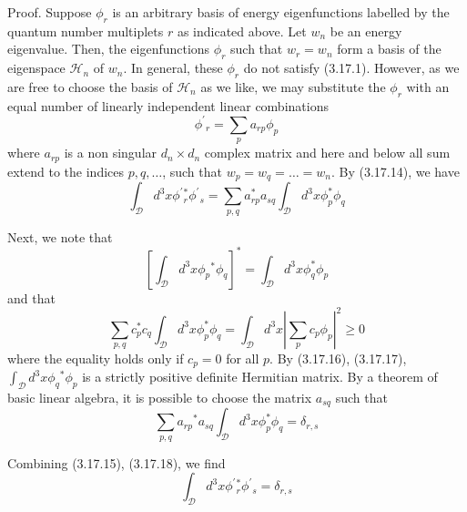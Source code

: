 \documentclass{article}
\begin{document}
Proof. Suppose $\phi_{r}$ is an arbitrary basis of energy eigenfunctions labelled by the quantum number multiplets $r$ as indicated above. Let $w_{n}$ be an energy eigenvalue. Then, the eigenfunctions $\phi_{r}$ such that $w_{r}=w_{n}$ form a basis of the eigenspace $\mathcal{H}_{n}$ of $w_{n}$. In general, these $\phi_{r}$ do not satisfy (3.17.1). However, as we are free to choose the basis of $\mathcal{H}_{n}$ as we like, we may substitute the $\phi_{r}$ with an equal number of linearly independent linear combinations
$$
\begin{equation*}
\phi^{\prime}{ }_{r}=\sum_{p} a_{r p} \phi_{p} \tag{3.17.14}
\end{equation*}
$$
where $a_{r p}$ is a non singular $d_{n} \times d_{n}$ complex matrix and here and below all sum extend
to the indices $p, q, \ldots$, such that $w_{p}=w_{q}=\ldots=w_{n}$. By (3.17.14), we have
$$
\begin{equation*}
\int_{\mathcal{D}} d^{3} x \phi^{\prime}{ }_{r}^{*} \phi^{\prime}{ }_{s}=\sum_{p, q} a_{r p}^{*} a_{s q} \int_{\mathcal{D}} d^{3} x \phi_{p}^{*} \phi_{q} \tag{3.17.15}
\end{equation*}
$$

Next, we note that
$$
\begin{equation*}
\left[\int_{\mathcal{D}} d^{3} x \phi_{p}{ }^{*} \phi_{q}\right]^{*}=\int_{\mathcal{D}} d^{3} x \phi_{q}^{*} \phi_{p} \tag{3.17.16}
\end{equation*}
$$
and that
$$
\begin{equation*}
\sum_{p, q} c_{p}^{*} c_{q} \int_{\mathcal{D}} d^{3} x \phi_{p}^{*} \phi_{q}=\int_{\mathcal{D}} d^{3} x\left|\sum_{p} c_{p} \phi_{p}\right|^{2} \geq 0 \tag{3.17.17}
\end{equation*}
$$
where the equality holds only if $c_{p}=0$ for all $p$. By (3.17.16), (3.17.17), $\int_{\mathcal{D}} d^{3} x \phi_{q}{ }^{*} \phi_{p}$ is a strictly positive definite Hermitian matrix. By a theorem of basic linear algebra, it is possible to choose the matrix $a_{s q}$ such that
$$
\begin{equation*}
\sum_{p, q} a_{r p}{ }^{*} a_{s q} \int_{\mathcal{D}} d^{3} x \phi_{p}^{*} \phi_{q}=\delta_{r, s} \tag{3.17.18}
\end{equation*}
$$

Combining (3.17.15), (3.17.18), we find
$$
\begin{equation*}
\int_{\mathcal{D}} d^{3} x \phi^{\prime}{ }_{r}^{*} \phi^{\prime}{ }_{s}=\delta_{r, s} \tag{3.17.19}
\end{equation*}
$$
\end{document}
